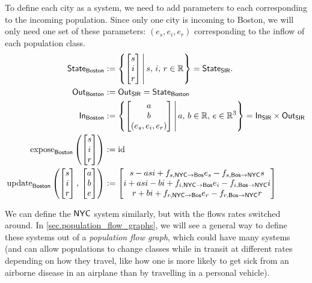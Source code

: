 \documentclass[DynamicalBook]{subfiles}
\begin{document}
\begin{example}
  To define each city as a system, we need to add parameters to each
  corresponding to the incoming population. Since only one city is incoming to
  Boston, we will only need one set of these parameters: $(e_s, e_i, e_r)$
  corresponding to the inflow of each population class. 
  \begin{align*}
    \mathsf{State}_{\mathsf{Boston}} &:= \left\{\begin{bmatrix} s \\ i \\ r \end{bmatrix}\, \middle|\, s,\, i,\, r\in \mathbb{R}\right\} = \mathsf{State}_{\mathsf{SIR}}. \\
    \mathsf{Out}_{\mathsf{Boston}} &:= \mathsf{Out}_{\mathsf{SIR}} = \mathsf{State}_{\mathsf{Boston}} \\
    \mathsf{In}_{\mathsf{Boston}} &:= \left\{ \begin{bmatrix} a \\ b \\ (e_s, e_i, e_r)  \end{bmatrix}\, \middle|\, a,\,b\in \mathbb{R},\, e \in \mathbb{R}^3 \right\}= \mathsf{In}_{\mathsf{SIR}} \times \mathsf{Out}_{\mathsf{SIR}}\\
    \mathrm{expose}_{\mathsf{Boston}}\left( \begin{bmatrix} s \\ i \\ r \end{bmatrix}\right) &:= \mathrm{id} \\
    \mathrm{update}_{\mathsf{Boston}}\left( \begin{bmatrix} s\\ i\\ r \end{bmatrix},\, \begin{bmatrix} a\\ b\\  e\end{bmatrix} \right) &:= \begin{bmatrix}s - asi + f_{s, \mathsf{NYC}\to\mathsf{Bos}}e_s - f_{s, \mathsf{Bos}\to\mathsf{NYC}} s \\ i + asi - bi + f_{i, \mathsf{NYC}\to\mathsf{Bos}}e_i - f_{i, \mathsf{Bos}\to\mathsf{NYC}} i \\ r + bi+ f_{r, \mathsf{NYC}\to\mathsf{Bos}}e_r - f_{r, \mathsf{Bos}\to\mathsf{NYC}} r \end{bmatrix} 
  \end{align*}

We can define the $\mathsf{NYC}$ system similarly, but with the flows rates
switched around. In \cref{sec.population_flow_graphs}, we will see a general way
to define these systems out of a \emph{population flow graph}, which could have
many systems (and can allow populations to change classes while in transit at
different rates depending on how they travel, like how one is more likely to get
sick from an airborne disease in an airplane than by travelling in a personal
vehicle).


\end{example}
\end{document}
